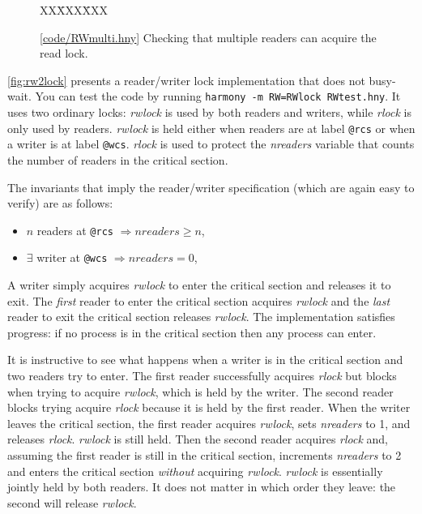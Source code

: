 \documentclass{report}
\newcommand{\harmonysource}[1]{
\begin{tabbing}
XX\=XXX\=XXX\kill
    
\end{tabbing}
}
\newcommand{\harmonylink}[1]{%
[\href{https://www.cs.cornell.edu/home/rvr/harmony/#1}{\underline{#1}}]%
}
\newenvironment{code}{
\tcolorbox
}{
\endtcolorbox
}
\begin{document}
\begin{figure}
\begin{code}
\harmonysource{RWmulti}
\end{code}
\caption{\harmonylink{code/RWmulti.hny} Checking that multiple readers can acquire the read lock.}
\label{fig:rwmulti}
\end{figure}

\autoref{fig:rw2lock} presents a reader/writer lock implementation
that does not busy-wait.
You can test the code by running \texttt{harmony -m RW=RWlock RWtest.hny}.
It uses two ordinary locks: \textit{rwlock} is used by both readers and writers,
while \textit{rlock} is only used by readers.
\textit{rwlock} is held either when readers are at label \texttt{@rcs}
or when a writer is at label \texttt{@wcs}.
\textit{rlock} is used to protect the \textit{nreaders} variable that
counts the number of readers in the critical section. 

The invariants that imply the reader/writer specification
(which are again easy to verify) are as follows:

\begin{itemize}
\item $n$ readers at \texttt{@rcs} $\Rightarrow \mathit{nreaders} \ge n$,
\item $\exists$ writer at \texttt{@wcs} $\Rightarrow \mathit{nreaders} = 0$,
\end{itemize}

A writer simply acquires \textit{rwlock} to enter the critical section
and releases it to exit.  The \emph{first} reader to enter the critical
section acquires \textit{rwlock} and the \emph{last} reader to exit
the critical section releases \textit{rwlock}.
The implementation satisfies progress: if no process is in the critical
section then any process can enter.

It is instructive to see what happens when a writer is in the critical
section and two readers try to enter.  The first reader successfully
acquires \textit{rlock} but blocks when trying to acquire
\textit{rwlock}, which is held by the writer.  The second reader blocks
trying acquire \textit{rlock} because it is held by the first reader.
When the writer leaves the critical section, the first reader acquires
\textit{rwlock}, sets \textit{nreaders} to 1, and releases \textit{rlock}.
\textit{rwlock} is still held.
Then the second reader acquires \textit{rlock} and, assuming the first
reader is still in the critical section, increments \textit{nreaders} to 2
and enters the critical section \emph{without} acquiring \textit{rwlock}.
\textit{rwlock} is essentially jointly held by both readers.
It does not matter in which order they leave: the second will release
\textit{rwlock}.
\end{document}
